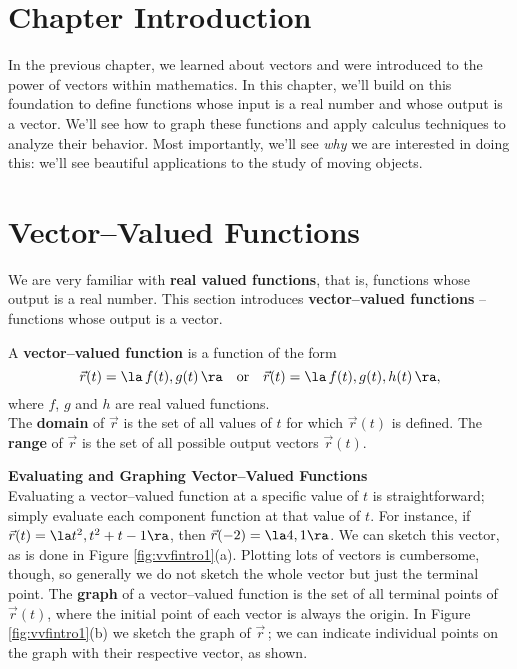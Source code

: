 \iflatexml\section*{Chapter Introduction}\fi

In the previous chapter, we learned about vectors and were introduced to the power of vectors within mathematics. In this chapter, we'll build on this foundation to define functions whose input is a real number and whose output is a vector. We'll see how to graph these functions and apply calculus techniques to analyze their behavior. Most importantly, we'll see \textit{why} we are interested in doing this: we'll see beautiful applications to the study of moving objects.

\section{Vector--Valued Functions}\label{sec:vvf}

We are very familiar with \textbf{real valued functions}, that is, functions whose output is a real number. This section introduces \textbf{vector--valued functions} -- functions whose output is a vector. 

{A \textbf{vector--valued function} is a function of the form 
$$\vec r(t) = \la\, f(t),g(t)\,\ra \quad \text{or}\quad \vec r(t) = \la \,f(t),g(t),h(t)\,\ra,$$
where $f$, $g$ and $h$ are real valued functions.\\

The \textbf{domain} of $\vec r$ is the set of all values of $t$ for which $\vec r(t)$ is defined. The \textbf{range} of $\vec r$ is the set of all possible output vectors $\vec r(t)$.
}

\noindent\textbf{Evaluating and Graphing Vector--Valued Functions}\\

Evaluating a vector--valued function at a specific value of $t$ is straightforward; simply evaluate each component function at that value of $t$. For instance, if $\vec r(t) = \la t^2,t^2+t-1\ra$, then $\vec r(-2) = \la 4,1\ra$. We can sketch this vector, as is done in Figure \ref{fig:vvfintro1}(a). Plotting lots of vectors is cumbersome, though, so generally we do not sketch the whole vector but just the terminal point. The \textbf{graph} of a vector--valued function is the set of all terminal points of $\vec r(t)$, where the initial point of each vector is always the origin. In Figure \ref{fig:vvfintro1}(b) we sketch the graph of $\vec r$\,; we can indicate individual points on the graph with their respective vector, as shown.

